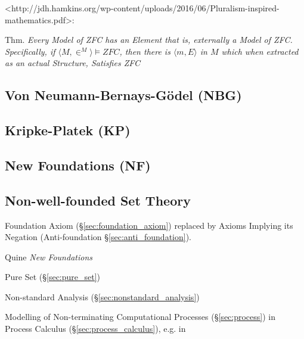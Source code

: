 <http://jdh.hamkins.org/wp-content/uploads/2016/06/Pluralism-inspired-mathematics.pdf>:

Thm. \emph{Every Model of ZFC has an Element that is, externally a
  Model of ZFC. Specifically, if $\langle{M,\in^M}\rangle \vDash ZFC$,
then there is $\langle{m,E}\rangle$ in $M$ which when extracted as an
actual Structure, Satisfies ZFC}



\subsection{Von Neumann-Bernays-G\"odel (NBG)}\label{sec:nbg}

\subsection{Kripke-Platek (KP)}\label{sec:kripke_platek}

\subsection{New Foundations (NF)}\label{sec:quine_foundations}

\subsection{Non-well-founded Set Theory}\label{sec:non_wellfounded}

\cite{aczel88}

Foundation Axiom (\S\ref{sec:foundation_axiom}) replaced by Axioms
Implying its Negation (Anti-foundation \S\ref{sec:anti_foundation}).

Quine \emph{New Foundations}

Pure Set (\S\ref{sec:pure_set})

Non-standard Analysis (\S\ref{sec:nonstandard_analysis})

Modelling of Non-terminating Computational Processes
(\S\ref{sec:process}) in Process Calculus
(\S\ref{sec:process_calculus}), e.g. in
\cite{abramsky-gay-nagarajan96}

